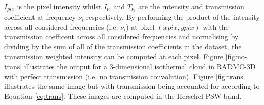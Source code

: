 \documentclass{report}
\begin{document}
$I_{pix}$ is the pixel intensity whilst $I_{\nu_i}$ and $T_{\nu_i}$ are the intensity and transmission coefficient at frequency $\nu_i$ respectively.  By performing the product of the intensity across all considered frequencies (i.e. $\nu_i$) at pixel $(xpix,ypix)$ with the transmission coefficent across all considered frequencies and normalising by dividing by the sum of all of the transmission coefficients in the dataset, the transmission weighted intensity can be computed at each pixel. Figure \ref{fig:no-trans} illustrates the output for a 3-dimensional isothermal cloud in RADMC-3D with perfect transmission (i.e. no transmission convolution). Figure \ref{fig:trans} illustrates the same image but with transmission being accounted for according to Equation \ref{eq:trans}. These images are computed in the Herschel PSW band.
\end{document}
